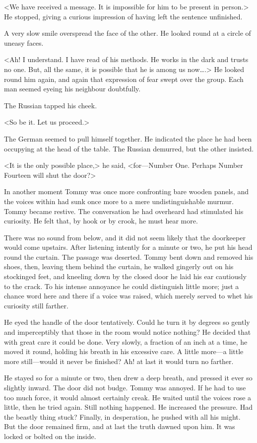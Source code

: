 <We have received a message. It is impossible for him to be present in person.> He stopped, giving a curious impression of having left the sentence unfinished.

A very slow smile overspread the face of the other. He looked round at a circle of uneasy faces.

<Ah! I understand. I have read of his methods. He works in the dark and trusts no one. But, all the same, it is possible that he is among us now\dots.> He looked round him again, and again that expression of fear swept over the group. Each man seemed eyeing his neighbour doubtfully.

The Russian tapped his cheek.

<So be it. Let us proceed.>

The German seemed to pull himself together. He indicated the place he had been occupying at the head of the table. The Russian demurred, but the other insisted.

<It is the only possible place,> he said, <for—Number One. Perhaps Number Fourteen will shut the door?>

In another moment Tommy was once more confronting bare wooden panels, and the voices within had sunk once more to a mere undistinguishable murmur. Tommy became restive. The conversation he had overheard had stimulated his curiosity. He felt that, by hook or by crook, he must hear more.

There was no sound from below, and it did not seem likely that the doorkeeper would come upstairs. After listening intently for a minute or two, he put his head round the curtain. The passage was deserted. Tommy bent down and removed his shoes, then, leaving them behind the curtain, he walked gingerly out on his stockinged feet, and kneeling down by the closed door he laid his ear cautiously to the crack. To his intense annoyance he could distinguish little more; just a chance word here and there if a voice was raised, which merely served to whet his curiosity still farther.

He eyed the handle of the door tentatively. Could he turn it by degrees so gently and imperceptibly that those in the room would notice nothing? He decided that with great care it could be done. Very slowly, a fraction of an inch at a time, he moved it round, holding his breath in his excessive care. A little more—a little more still—would it never be finished? Ah! at last it would turn no farther.

He stayed so for a minute or two, then drew a deep breath, and pressed it ever so slightly inward. The door did not budge. Tommy was annoyed. If he had to use too much force, it would almost certainly creak. He waited until the voices rose a little, then he tried again. Still nothing happened. He increased the pressure. Had the beastly thing stuck? Finally, in desperation, he pushed with all his might. But the door remained firm, and at last the truth dawned upon him. It was locked or bolted on the inside.

